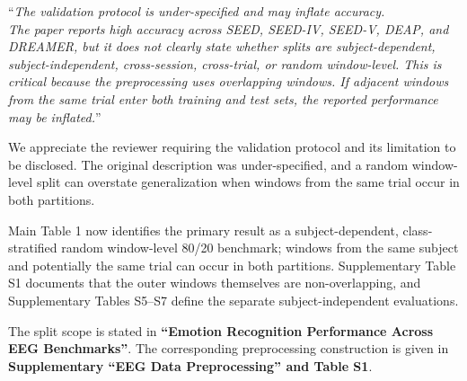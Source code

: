 \documentclass[12pt,technote,onecolumn]{IEEEtran}
\begin{document}
\vspace{4mm}

``{\it The validation protocol is under-specified and may inflate accuracy.\\
The paper reports high accuracy across SEED, SEED-IV, SEED-V, DEAP, and
DREAMER, but it does not clearly state whether splits are
subject-dependent, subject-independent, cross-session, cross-trial, or
random window-level. This is critical because the preprocessing uses
overlapping windows. If adjacent windows from the same trial enter both
training and test sets, the reported performance may be inflated.}''
\vspace{1mm}


We appreciate the reviewer requiring the validation protocol and its limitation to be disclosed. The original description was under-specified, and a random window-level split can overstate generalization when windows from the same trial occur in both partitions.

Main Table 1 now identifies the primary result as a subject-dependent,
class-stratified random window-level 80/20 benchmark; windows from the
same subject and potentially the same trial can occur in both partitions.
Supplementary Table S1 documents that the outer windows themselves are
non-overlapping, and Supplementary Tables S5--S7 define the separate
subject-independent evaluations.

The split scope is stated in \textbf{``Emotion Recognition Performance Across EEG Benchmarks''}. The corresponding preprocessing construction is given in \textbf{Supplementary ``EEG Data Preprocessing'' and Table S1}.

\EvidenceMainTableOne
\end{document}
